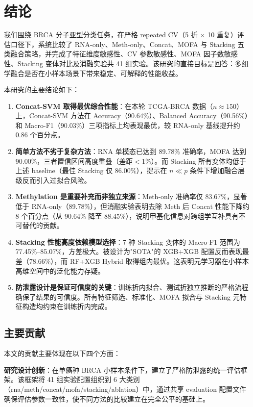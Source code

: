 \section{结论}

我们围绕 BRCA 分子亚型分类任务，在严格 repeated CV（5 折 $\times$ 10 重复）评估口径下，系统比较了 RNA-only、Meth-only、Concat、MOFA 与 Stacking 五类融合策略，并完成了特征维度敏感性、CV 参数敏感性、MOFA 因子数敏感性、Stacking 变体对比及消融实验共 41 组实验。该研究的直接目标是回答：多组学融合是否在小样本场景下带来稳定、可解释的性能收益。

本研究的主要结论如下：

\begin{enumerate}
    \item \textbf{Concat-SVM 取得最优综合性能}：在本轮 TCGA-BRCA 数据（$n\approx 150$）上，Concat-SVM 方法在 Accuracy（90.64\%）、Balanced Accuracy（90.56\%）和 Macro-F1（90.03\%）三项指标上均表现最优，较 RNA-only 基线提升约 0.86 个百分点。
    \item \textbf{简单方法不劣于复杂方法}：RNA 单模态已达到 89.78\% 准确率，MOFA 达到 90.00\%，三者置信区间高度重叠（差距$<$1\%）。而 Stacking 所有变体均低于上述 baseline（最佳 Stacking 仅 86.00\%），提示在 $n\ll p$ 条件下增加融合层级反而引入过拟合风险。
    \item \textbf{Methylation 是重要补充而非独立来源}：Meth-only 准确率仅 83.67\%，显著低于 RNA-only（89.78\%），但消融实验表明去除 Meth 后 Concat 性能下降约 8 个百分点（从 90.64\% 降至 88.45\%），说明甲基化信息对跨组学互补具有不可替代的贡献。
    \item \textbf{Stacking 性能高度依赖模型选择}：7 种 Stacking 变体的 Macro-F1 范围为 77.45\%--85.07\%，方差极大。被设计为"SOTA"的 XGB+XGB 配置反而表现最差（78.66\%），而 RF+XGB Hybrid 取得组内最优。这表明元学习器在小样本高维空间中的泛化能力存疑。
    \item \textbf{防泄露设计是保证可信度的关键}：训练折内拟合、测试折独立推断的严格流程确保了结果的可信度。所有特征筛选、标准化、MOFA 拟合与 Stacking 元特征构造均约束在训练折内完成。
\end{enumerate}

\subsection{主要贡献}

本文的贡献主要体现在以下四个方面：

\textbf{研究设计创新}：在单癌种 BRCA 小样本条件下，建立了严格防泄露的统一评估框架。该框架将 41 组实验配置组织到 6 大类别（rna/meth/concat/mofa/stacking/ablation）中，通过共享 evaluation 配置文件确保评估参数一致性，使不同方法的比较建立在完全公平的基础上。

